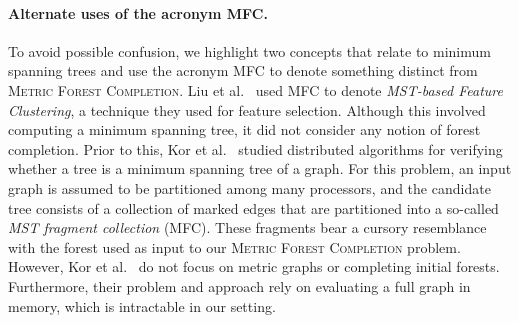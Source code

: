 \paragraph{Alternate uses of the acronym MFC.}
To avoid possible confusion, we highlight two concepts that relate to minimum spanning trees and use the acronym MFC to denote something distinct from \textsc{Metric Forest Completion}. Liu et al.~\cite{liu2014supervised} used MFC to denote \textit{MST-based Feature Clustering}, a technique they used for feature selection. Although this involved computing a minimum spanning tree, it did not consider any notion of forest completion. Prior to this, Kor et al.~\cite{kor2011tight} studied distributed algorithms for verifying whether a tree is a minimum spanning tree of a graph. For this problem, an input graph is assumed to be partitioned among many processors, and the candidate tree consists of a collection of marked edges that are partitioned into a so-called \textit{MST fragment collection} (MFC). These fragments bear a cursory resemblance with the forest used as input to our \textsc{Metric Forest Completion} problem. However, Kor et al.~\cite{kor2011tight} do not focus on metric graphs or completing initial forests. Furthermore, their problem and approach rely on evaluating a full graph in memory, which is intractable in our setting.

